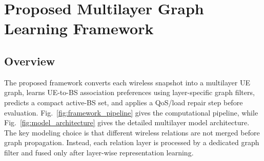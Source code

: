 \documentclass[journal]{IEEEtran}
\begin{document}
\section{Proposed Multilayer Graph Learning Framework}
\subsection{Overview}
The proposed framework converts each wireless snapshot into a multilayer UE
graph, learns UE-to-BS association preferences using layer-specific graph
filters, predicts a compact active-BS set, and applies a QoS/load repair step
before evaluation. Fig.~\ref{fig:framework_pipeline} gives the computational
pipeline, while Fig.~\ref{fig:model_architecture} gives the detailed
multilayer model architecture. The key modeling choice is that different
wireless relations are not merged before graph propagation. Instead, each
relation layer is processed by a dedicated graph filter and fused only after
layer-wise representation learning.
\end{document}
